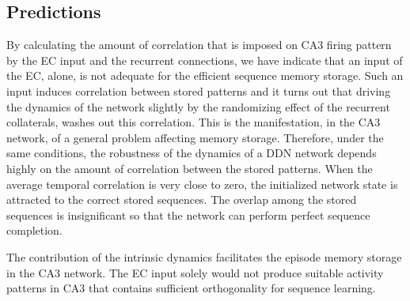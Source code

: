 \documentclass[utf8]{frontiersSCNS} %
\begin{document}



\subsection{Predictions}
By calculating the amount of correlation that is imposed on CA3 firing pattern by the EC input and the recurrent connections, we have indicate that an input of the EC, alone, is not adequate for the efficient sequence memory storage. Such an input induces correlation between stored patterns and it turns out that driving the dynamics of the network slightly by the randomizing effect of the recurrent collaterals, washes out this correlation. This is the manifestation, in the CA3 network, of a general problem affecting memory storage. 
Therefore, under the same conditions, the robustness of the dynamics of a DDN network depends highly on the amount of correlation between the stored patterns. When the average temporal correlation is very close to zero, the initialized network state is attracted to the correct stored sequences. The overlap among the stored sequences is insignificant so that the network can perform perfect sequence completion.


The contribution of the intrinsic dynamics facilitates the episode memory storage in the CA3 network. The EC input solely would not produce suitable activity patterns in CA3 that contains sufficient orthogonality for sequence learning.
\end{document}
